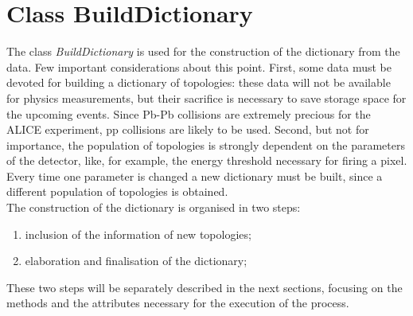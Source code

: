 \section{Class BuildDictionary}
\label{sec:buildic}
The class \textit{BuildDictionary} is used for the construction of the dictionary from the data. Few important considerations about this point. First, some data must be devoted for building a dictionary of topologies: these data will not be available for physics measurements, but their sacrifice is necessary to save storage space for the upcoming events. Since Pb-Pb collisions are extremely precious for the ALICE experiment, pp collisions are likely to be used. Second, but not for importance, the population of topologies is strongly dependent on the parameters of the detector, like, for example, the energy threshold necessary for firing a pixel. Every time one parameter is changed a new dictionary must be built, since a different population of topologies is obtained.\\
The construction of the dictionary is organised in two steps:
\begin{enumerate}
 \item inclusion of the information of new topologies;
 \item elaboration and finalisation of the dictionary;
\end{enumerate}
These two steps will be separately described in the next sections, focusing on the methods and the attributes necessary for the execution of the process.
